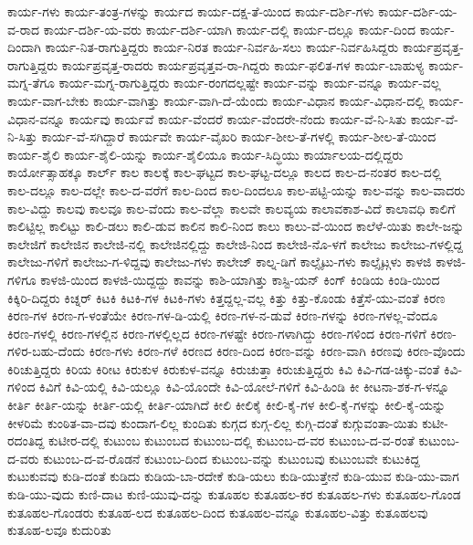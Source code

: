 {ಕಾರ್ಯ-ಗಳು
ಕಾರ್ಯ-ತಂತ್ರ-ಗಳನ್ನು
ಕಾರ್ಯದ
ಕಾರ್ಯ-ದಕ್ಷ-ತೆ-ಯಿಂದ
ಕಾರ್ಯ-ದರ್ಶಿ-ಗಳು
ಕಾರ್ಯ-ದರ್ಶಿ-ಯ-ವ-ರಾದ
ಕಾರ್ಯ-ದರ್ಶಿ-ಯ-ವರು
ಕಾರ್ಯ-ದರ್ಶಿ-ಯಾಗಿ
ಕಾರ್ಯ-ದಲ್ಲಿ
ಕಾರ್ಯ-ದಲ್ಲೂ
ಕಾರ್ಯ-ದಿಂದ
ಕಾರ್ಯ-ದಿಂದಾಗಿ
ಕಾರ್ಯ-ನಿತ-ರಾಗುತ್ತಿದ್ದರು
ಕಾರ್ಯ-ನಿರತ
ಕಾರ್ಯ-ನಿರ್ವಹಿ-ಸಲು
ಕಾರ್ಯ-ನಿರ್ವಹಿಸಿದ್ದರು
ಕಾರ್ಯಪ್ರವೃತ್ತ-ರಾಗುತ್ತಿದ್ದರು
ಕಾರ್ಯಪ್ರವೃತ್ತ-ರಾದರು
ಕಾರ್ಯಪ್ರವೃತ್ತವ-ರಾ-ಗಿದ್ದರು
ಕಾರ್ಯ-ಫಲಿತ-ಗಳ
ಕಾರ್ಯ-ಬಾಹುಳ್ಯ
ಕಾರ್ಯ-ಮಗ್ನ-ತೆಗೂ
ಕಾರ್ಯ-ಮಗ್ನ-ರಾಗುತ್ತಿದ್ದರು
ಕಾರ್ಯ-ರಂಗದಲ್ಲಷ್ಟೇ
ಕಾರ್ಯ-ವನ್ನು
ಕಾರ್ಯ-ವನ್ನೂ
ಕಾರ್ಯ-ವಲ್ಲ
ಕಾರ್ಯ-ವಾಗ-ಬೇಕು
ಕಾರ್ಯ-ವಾಗಿತ್ತು
ಕಾರ್ಯ-ವಾಗಿ-ದೆ-ಯೆಂದು
ಕಾರ್ಯ-ವಿಧಾನ
ಕಾರ್ಯ-ವಿಧಾನ-ದಲ್ಲಿ
ಕಾರ್ಯ-ವಿಧಾನ-ವನ್ನೂ
ಕಾರ್ಯವು
ಕಾರ್ಯವೆ
ಕಾರ್ಯ-ವೆಂದರೆ
ಕಾರ್ಯ-ವೆಂದರೇ-ನೆಂದು
ಕಾರ್ಯ-ವೆ-ನಿ-ಸಿತು
ಕಾರ್ಯ-ವೆ-ನಿ-ಸಿತ್ತು
ಕಾರ್ಯ-ವೆ-ಸಗಿದ್ದಾರೆ
ಕಾರ್ಯವೇ
ಕಾರ್ಯ-ವೈಖರಿ
ಕಾರ್ಯ-ಶೀಲ-ತೆ-ಗಳಲ್ಲಿ
ಕಾರ್ಯ-ಶೀಲ-ತೆ-ಯಿಂದ
ಕಾರ್ಯ-ಶೈಲಿ
ಕಾರ್ಯ-ಶೈಲಿ-ಯನ್ನು
ಕಾರ್ಯ-ಶೈಲಿಯೂ
ಕಾರ್ಯ-ಸಿದ್ಧಿಯು
ಕಾರ್ಯಾಲಯ-ದಲ್ಲಿದ್ದರು
ಕಾರ್ಯೋತ್ಸಾಹಕ್ಕೂ
ಕಾರ್ಲ್
ಕಾಲ
ಕಾಲಕ್ಕೆ
ಕಾಲ-ಘಟ್ಟದ
ಕಾಲ-ಘಟ್ಟ-ದಲ್ಲೂ
ಕಾಲದ
ಕಾಲ-ದ-ನಂತರ
ಕಾಲ-ದಲ್ಲಿ
ಕಾಲ-ದಲ್ಲೂ
ಕಾಲ-ದಲ್ಲೇ
ಕಾಲ-ದ-ವರೆಗೆ
ಕಾಲ-ದಿಂದ
ಕಾಲ-ದಿಂದಲೂ
ಕಾಲ-ಪಟ್ಟಿ-ಯನ್ನು
ಕಾಲ-ವನ್ನು
ಕಾಲ-ವಾದರು
ಕಾಲ-ವಿದ್ದು
ಕಾಲವು
ಕಾಲವೂ
ಕಾಲ-ವೆಂದು
ಕಾಲ-ವೆಲ್ಲಾ
ಕಾಲವೇ
ಕಾಲವ್ಯಯ
ಕಾಲಾವಕಾಶ-ವಿದೆ
ಕಾಲಾವಧಿ
ಕಾಲಿಗೆ
ಕಾಲಿಟ್ಟಿಲ್ಲ
ಕಾಲಿಟ್ಟು
ಕಾಲಿ-ಡಲು
ಕಾಲಿ-ಡುವ
ಕಾಲಿನ
ಕಾಲಿ-ನಿಂದ
ಕಾಲು
ಕಾಲು-ವೆ-ಯಿಂದ
ಕಾಲೆಳೆ-ಯಿತು
ಕಾಲೇ-ಜನ್ನು
ಕಾಲೇಜಿಗೆ
ಕಾಲೇಜಿನ
ಕಾಲೇಜಿ-ನಲ್ಲಿ
ಕಾಲೇಜಿನಲ್ಲಿದ್ದು
ಕಾಲೇಜಿ-ನಿಂದ
ಕಾಲೇಜಿ-ನೊ-ಳಗೆ
ಕಾಲೇಜು
ಕಾಲೇಜು-ಗಳಲ್ಲಿದ್ದ
ಕಾಲೇಜು-ಗಳಿಗೆ
ಕಾಲೇಜು-ಗ-ಳಿದ್ದವು
ಕಾಲೇಜು-ಗಳು
ಕಾಲೇಜ್
ಕಾಲ್ನ-ಡಿಗೆ
ಕಾಲ್ಸೈಟು-ಗಳು
ಕಾಲ್ಸೈಟ್ಗಳು
ಕಾಳಜಿ
ಕಾಳಜಿ-ಗಳಿಗೂ
ಕಾಳಜಿ-ಯಿಂದ
ಕಾಳಜಿ-ಯಿದ್ದದ್ದು
ಕಾವನ್ನು
ಕಾಶಿ-ಯಾಗಿತ್ತು
ಕಾಸ್ಟಿ-ಯನ್
ಕಿಂಗ್
ಕಿಂಡಿಯ
ಕಿಂಡಿ-ಯಿಂದ
ಕಿಕ್ಕಿರಿ-ದಿದ್ದರು
ಕಿಚ್ನರ್
ಕಿಟಕಿ
ಕಿಟಕಿ-ಗಳ
ಕಿಟಕಿ-ಗಳು
ಕಿತ್ತದ್ದಲ್ಲ-ವಲ್ಲ
ಕಿತ್ತು
ಕಿತ್ತು-ಕೊಂಡು
ಕಿತ್ತೆಸೆ-ಯು-ವಂತೆ
ಕಿರಣ
ಕಿರಣ-ಗಳ
ಕಿರಣ-ಗ-ಳಂತೆಯೇ
ಕಿರಣ-ಗಳ-ಡಿ-ಯಲ್ಲಿ
ಕಿರಣ-ಗಳ-ನ-ಡುವೆ
ಕಿರಣ-ಗಳನ್ನು
ಕಿರಣ-ಗಳಲ್ಲ-ವೆಂದೂ
ಕಿರಣ-ಗಳಲ್ಲಿ
ಕಿರಣ-ಗಳಲ್ಲಿನ
ಕಿರಣ-ಗಳಲ್ಲಿಲ್ಲದ
ಕಿರಣ-ಗಳಷ್ಟೇ
ಕಿರಣ-ಗಳಾಗಿದ್ದು
ಕಿರಣ-ಗಳಿಂದ
ಕಿರಣ-ಗಳಿಗೆ
ಕಿರಣ-ಗಳಿರ-ಬಹು-ದೆಂದು
ಕಿರಣ-ಗಳು
ಕಿರಣ-ಗಳೆ
ಕಿರಣದ
ಕಿರಣ-ದಿಂದ
ಕಿರಣ-ವನ್ನು
ಕಿರಣ-ವಾಗಿ
ಕಿರಣವು
ಕಿರಣ-ವೊಂದು
ಕಿರಿಚುತ್ತಿದ್ದರು
ಕಿರಿಯ
ಕಿರೀಟ
ಕಿರುಕುಳ
ಕಿರುಕುಳ-ವನ್ನೂ
ಕಿರುಚುತ್ತಾ
ಕಿರುಚುತ್ತಿದ್ದರು
ಕಿವಿ
ಕಿವಿ-ಗಡ-ಚಿಕ್ಕು-ವಂತೆ
ಕಿವಿ-ಗಳಿಂದ
ಕಿವಿಗೆ
ಕಿವಿ-ಯಲ್ಲಿ
ಕಿವಿ-ಯಲ್ಲೂ
ಕಿವಿ-ಯೊಂದೇ
ಕಿವಿ-ಯೋಲೆ-ಗಳಿಗೆ
ಕಿವಿ-ಹಿಂಡಿ
ಕೀ
ಕೀಟನಾ-ಶಕ-ಗ-ಳನ್ನೂ
ಕೀರ್ತಿ
ಕೀರ್ತಿ-ಯನ್ನು
ಕೀರ್ತಿ-ಯಲ್ಲಿ
ಕೀರ್ತಿ-ಯಾಗಿದೆ
ಕೀಲಿ
ಕೀಲಿಕೈ
ಕೀಲಿ-ಕೈ-ಗಳ
ಕೀಲಿ-ಕೈ-ಗಳನ್ನು
ಕೀಲಿ-ಕೈ-ಯನ್ನು
ಕೀಳರಿಮೆ
ಕುಂಠಿತ-ವಾ-ದವು
ಕುಂದಾಗ-ಲಿಲ್ಲ
ಕುಂದಿತು
ಕುಗ್ಗದ
ಕುಗ್ಗ-ಲಿಲ್ಲ
ಕುಗ್ಗಿ-ದಂತೆ
ಕುಗ್ಗುವಂತಾ-ಯಿತು
ಕುಟೀ-ರದಂತಿದ್ದ
ಕುಟೀರ-ದಲ್ಲಿ
ಕುಟುಂಬ
ಕುಟುಂಬದ
ಕುಟುಂಬ-ದಲ್ಲಿ
ಕುಟುಂಬ-ದ-ವರ
ಕುಟುಂಬ-ದ-ವ-ರಂತೆ
ಕುಟುಂಬ-ದ-ವರು
ಕುಟುಂಬ-ದ-ವ-ರೊಡನೆ
ಕುಟುಂಬ-ದಿಂದ
ಕುಟುಂಬ-ವನ್ನು
ಕುಟುಂಬವು
ಕುಟುಂಬವೇ
ಕುಟುಕಿದ್ದ
ಕುಟುಕುವವು
ಕುಡಿ-ದಂತೆ
ಕುಡಿದು
ಕುಡಿಯ-ಬಾ-ರದೇಕೆ
ಕುಡಿ-ಯಲು
ಕುಡಿ-ಯುತ್ತೇನೆ
ಕುಡಿ-ಯುವ
ಕುಡಿ-ಯು-ವಾಗ
ಕುಡಿ-ಯು-ವುದು
ಕುಣಿ-ದಾಟ
ಕುಣಿ-ಯುವು-ದನ್ನು
ಕುತೂಹಲ
ಕುತೂಹಲ-ಕರ
ಕುತೂಹಲ-ಗಳು
ಕುತೂಹಲ-ಗೊಂಡ
ಕುತೂಹಲ-ಗೊಂಡರು
ಕುತೂಹ-ಲದ
ಕುತೂಹಲ-ದಿಂದ
ಕುತೂಹಲ-ವನ್ನೂ
ಕುತೂಹಲ-ವಿತ್ತು
ಕುತೂಹಲವು
ಕುತೂಹ-ಲವೂ
ಕುದುರಿತು
}
